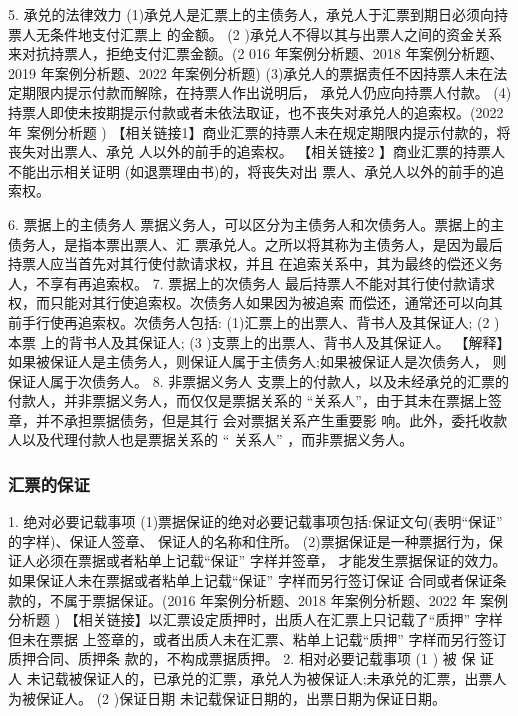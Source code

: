 \documentclass[UTF8,12pt]{ctexart}
\numberwithin{equation}{section} %
\numberwithin{figure}{section}
\numberwithin{table}{section}
\begin{document}
	5. 承兑的法律效力 (1)承兑人是汇票上的主债务人，承兑人于汇票到期日必须向持票人无条件地支付汇票上 的金额。
	(2 )承兑人不得以其与出票人之间的资金关系来对抗持票人，拒绝支付汇票金额。(2 016 年案例分析题、2018 年案例分析题、2019 年案例分析题、2022 年案例分析题) (3)承兑人的票据责任不因持票人未在法定期限内提示付款而解除，在持票人作出说明后， 承兑人仍应向持票人付款。 (4)持票人即使未按期提示付款或者未依法取证，也不丧失对承兑人的追索权。(2022 年 案例分析题 )
	【相关链接1】商业汇票的持票人未在规定期限内提示付款的，将丧失对出票人、承兑 人以外的前手的追索权。
	【相关链接2 】商业汇票的持票人不能出示相关证明 (如退票理由书)的，将丧失对出 票人、承兑人以外的前手的追索权。
	
	6. 票据上的主债务人 票据义务人，可以区分为主债务人和次债务人。票据上的主债务人，是指本票出票人、汇 票承兑人。之所以将其称为主债务人，是因为最后持票人应当首先对其行使付款请求权，并且 在追索关系中，其为最终的偿还义务人，不享有再追索权。
	7. 票据上的次债务人 最后持票人不能对其行使付款请求权，而只能对其行使追索权。次债务人如果因为被追索 而偿还，通常还可以向其前手行使再追索权。次债务人包括: (1)汇票上的出票人、背书人及其保证人;
	(2 )本票 上的背书人及其保证人;
	(3 )支票上的出票人、背书人及其保证人。 【解释】如果被保证人是主债务人，则保证人属于主债务人;如果被保证人是次债务人， 则保证人属于次债务人。
	8. 非票据义务人 支票上的付款人，以及未经承兑的汇票的付款人，并非票据义务人，而仅仅是票据关系的 “关系人”，由于其未在票据上签章，并不承担票据债务，但是其行 会对票据关系产生重要影 响。此外，委托收款人以及代理付款人也是票据关系的 “ 关系人” ，而非票据义务人。
	
	
	
	\subsubsection{汇票的保证} 
	1. 绝对必要记载事项
	(1)票据保证的绝对必要记载事项包括:保证文句(表明“保证” 的字样)、保证人签章、 保证人的名称和住所。 (2)票据保证是一种票据行为，保证人必须在票据或者粘单上记载“保证” 字样并签章， 才能发生票据保证的效力。如果保证人未在票据或者粘单上记载“保证” 字样而另行签订保证 合同或者保证条款的，不属于票据保证。(2016 年案例分析题、2018 年案例分析题、2022 年 案例分析题 )
	【相关链接】以汇票设定质押时，出质人在汇票上只记载了“质押” 字样但未在票据 上签章的，或者出质人未在汇票、粘单上记载“质押” 字样而另行签订质押合同、质押条 款的，不构成票据质押。
	2. 相对必要记载事项
	(1 ) 被 保 证 人 未记载被保证人的，已承兑的汇票，承兑人为被保证人;未承兑的汇票，出票人为被保证人。 (2 )保证日期
	未记载保证日期的，出票日期为保证日期。
	
\end{document}
